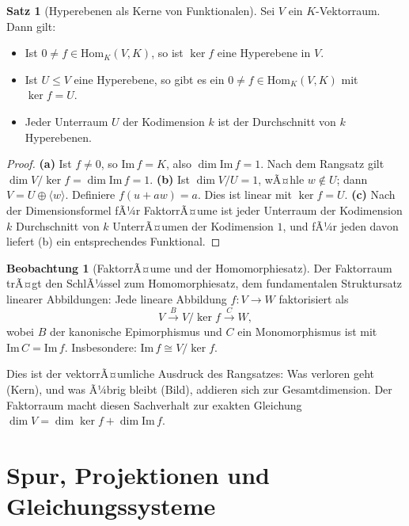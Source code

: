 ﻿\documentclass[a4paper,12pt]{report}
\theoremstyle{definition}
\newtheorem{satz}{Satz}
\newtheorem{beobachtung}{Beobachtung}
\begin{document}
\begin{satz}[Hyperebenen als Kerne von Funktionalen]
    Sei $V$ ein $K$-Vektorraum. Dann gilt:
    \begin{itemize}
        \item[-] Ist $0 \neq f \in \mathrm{Hom}_K(V, K)$, so ist $\ker f$
              eine Hyperebene in $V$.
        \item[-] Ist $U \leq V$ eine Hyperebene, so gibt es ein
              $0 \neq f \in \mathrm{Hom}_K(V, K)$ mit $\ker f = U$.
        \item[-] Jeder Unterraum $U$ der Kodimension $k$ ist der
              Durchschnitt von $k$ Hyperebenen.
    \end{itemize}
\end{satz}
\begin{proof}
    \textbf{(a)} Ist $f \neq 0$, so $\mathrm{Im}\, f = K$, also $\dim \mathrm{Im}\, f = 1$.
    Nach dem Rangsatz gilt $\dim V/\ker f = \dim \mathrm{Im}\, f = 1$.
    \textbf{(b)} Ist $\dim V/U = 1$, wÃ¤hle $w \notin U$; dann $V = U \oplus \langle w \rangle$.
    Definiere $f(u + aw) = a$. Dies ist linear mit $\ker f = U$.
    \textbf{(c)} Nach der Dimensionsformel fÃ¼r FaktorrÃ¤ume ist jeder Unterraum der
    Kodimension $k$ Durchschnitt von $k$ UnterrÃ¤umen der Kodimension $1$,
    und fÃ¼r jeden davon liefert (b) ein entsprechendes Funktional.
\end{proof}


\begin{beobachtung}[FaktorrÃ¤ume und der Homomorphiesatz]
    Der Faktorraum trÃ¤gt den SchlÃ¼ssel zum Homomorphiesatz, dem
    fundamentalen Struktursatz linearer Abbildungen: Jede lineare
    Abbildung $f : V \to W$ faktorisiert als
    \[
        V \xrightarrow{B} V/\ker f \xrightarrow{C} W,
    \]
    wobei $B$ der kanonische Epimorphismus und $C$ ein Monomorphismus ist
    mit $\mathrm{Im}\, C = \mathrm{Im}\, f$. Insbesondere:
    $\mathrm{Im}\, f \cong V / \ker f$.

    Dies ist der vektorrÃ¤umliche Ausdruck des Rangsatzes: Was verloren geht
    (Kern), und was Ã¼brig bleibt (Bild), addieren sich zur Gesamtdimension.
    Der Faktorraum macht diesen Sachverhalt zur exakten Gleichung
    $\dim V = \dim \ker f + \dim \mathrm{Im}\, f$.
\end{beobachtung}

\chapter{Spur, Projektionen und Gleichungssysteme}
\end{document}
